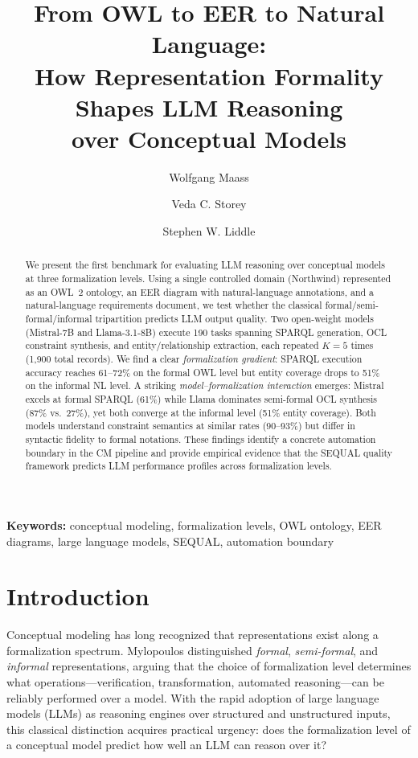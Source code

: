 \documentclass[runningheads]{llncs}
\title{From OWL to EER to Natural Language:\\How Representation Formality Shapes LLM Reasoning\\over Conceptual Models}
\author{
Wolfgang Maass\inst{1} \and
Veda C. Storey\inst{2} \and
Stephen W. Liddle\inst{3}
}
\institute{
German Research Center for Artificial Intelligence (DFKI), Saarbr\"{u}cken, Germany \\
\email{wolfgang.maass@dfki.de}
\and
Georgia State University, Atlanta, GA, USA \\
\email{vstorey@gsu.edu}
\and
Brigham Young University, Provo, UT, USA \\
\email{liddle@byu.edu}
}
\begin{document}
\maketitle

\begin{abstract}
We present the first benchmark for evaluating LLM reasoning over conceptual models at three formalization levels. Using a single controlled domain (Northwind) represented as an OWL~2 ontology, an EER diagram with natural-language annotations, and a natural-language requirements document, we test whether the classical formal/semi-formal/informal tripartition \cite{mylopoulos1992conceptual} predicts LLM output quality. Two open-weight models (Mistral-7B and Llama-3.1-8B) execute 190 tasks spanning SPARQL generation, OCL constraint synthesis, and entity/relationship extraction, each repeated $K\!=\!5$ times (1,900 total records). We find a clear \emph{formalization gradient}: SPARQL execution accuracy reaches 61--72\% on the formal OWL level but entity coverage drops to 51\% on the informal NL level. A striking \emph{model--formalization interaction} emerges: Mistral excels at formal SPARQL (61\%) while Llama dominates semi-formal OCL synthesis (87\% vs.\ 27\%), yet both converge at the informal level (51\% entity coverage). Both models understand constraint semantics at similar rates (90--93\%) but differ in syntactic fidelity to formal notations. These findings identify a concrete automation boundary in the CM pipeline and provide empirical evidence that the SEQUAL quality framework \cite{krogstie1995quality} predicts LLM performance profiles across formalization levels.
\end{abstract}

\textbf{Keywords:} conceptual modeling, formalization levels, OWL ontology, EER diagrams, large language models, SEQUAL, automation boundary

\section{Introduction}
\label{sec:intro}

Conceptual modeling has long recognized that representations exist along a formalization spectrum. Mylopoulos \cite{mylopoulos1992conceptual} distinguished \emph{formal}, \emph{semi-formal}, and \emph{informal} representations, arguing that the choice of formalization level determines what operations---verification, transformation, automated reasoning---can be reliably performed over a model. With the rapid adoption of large language models (LLMs) as reasoning engines over structured and unstructured inputs, this classical distinction acquires practical urgency: does the formalization level of a conceptual model predict how well an LLM can reason over it?
\end{document}
